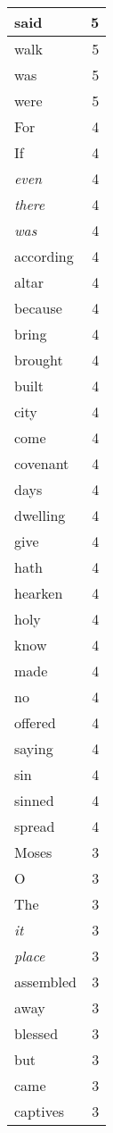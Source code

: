 \begin{center}
\begin{longtable}{l|r}
said & 5 \\ \hline
walk & 5 \\ \hline
was & 5 \\ \hline
were & 5 \\ \hline
For & 4 \\ \hline
If & 4 \\ \hline
\emph{even} & 4 \\ \hline
\emph{there} & 4 \\ \hline
\emph{was} & 4 \\ \hline
according & 4 \\ \hline
altar & 4 \\ \hline
because & 4 \\ \hline
bring & 4 \\ \hline
brought & 4 \\ \hline
built & 4 \\ \hline
city & 4 \\ \hline
come & 4 \\ \hline
covenant & 4 \\ \hline
days & 4 \\ \hline
dwelling & 4 \\ \hline
give & 4 \\ \hline
hath & 4 \\ \hline
hearken & 4 \\ \hline
holy & 4 \\ \hline
know & 4 \\ \hline
made & 4 \\ \hline
no & 4 \\ \hline
offered & 4 \\ \hline
saying & 4 \\ \hline
sin & 4 \\ \hline
sinned & 4 \\ \hline
spread & 4 \\ \hline
Moses & 3 \\ \hline
O & 3 \\ \hline
The & 3 \\ \hline
\emph{it} & 3 \\ \hline
\emph{place} & 3 \\ \hline
assembled & 3 \\ \hline
away & 3 \\ \hline
blessed & 3 \\ \hline
but & 3 \\ \hline
came & 3 \\ \hline
captives & 3 \\ \hline

\end{longtable}
\end{center}
